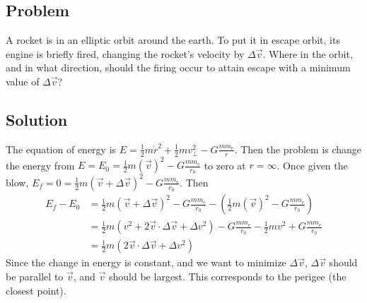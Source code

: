 \documentclass[solutions]{esg8012pset}
\begin{document}
\subsection{Problem}
  A rocket is in an elliptic orbit around the earth. To put it in escape orbit, its engine is briefly fired, changing the rocket's velocity by $\Delta \vec v$. Where in the orbit, and in what direction, should the firing occur to attain escape with a minimum value of $\Delta \vec v$?
\subsection{Solution}
The equation of energy is $E = \frac{1}{2} m\dot r^2 + \frac{1}{2}m v_{\bot}^2 - G\frac{m m_e}{r}$.  Then the problem is change the energy from $E = E_0 = \frac{1}{2} m(\vec v)^2 - G\frac{m m_e}{r_0}$ to zero at $r =\infty$.  Once given the blow, $E_f = 0 = \frac{1}{2} m(\vec v + \Delta \vec v)^2 - G\frac{m m_e}{r_0}$.  Then
\begin{align*}
E_f - E_0 & = \frac{1}{2} m(\vec v + \Delta \vec v)^2 - G\frac{m m_e}{r_0} -   \left(\frac{1}{2} m(\vec v)^2 - G\frac{m m_e}{r_0}\right) \\
 & = \frac{1}{2} m(v^2 + 2\vec v\cdot \Delta \vec v + \Delta v^2) - G\frac{m m_e}{r_0} - \frac{1}{2} mv^2 + G\frac{m m_e}{r_0} \\
 & = \frac{1}{2} m(2\vec v\cdot \Delta \vec v + \Delta v^2)
\end{align*}
Since the change in energy is constant, and we want to minimize $\Delta \vec v$, $\Delta \vec v$ should be parallel to $\vec v$, and $\vec v$ should be largest.  This corresponds to the perigee (the closest point).
\end{document}

